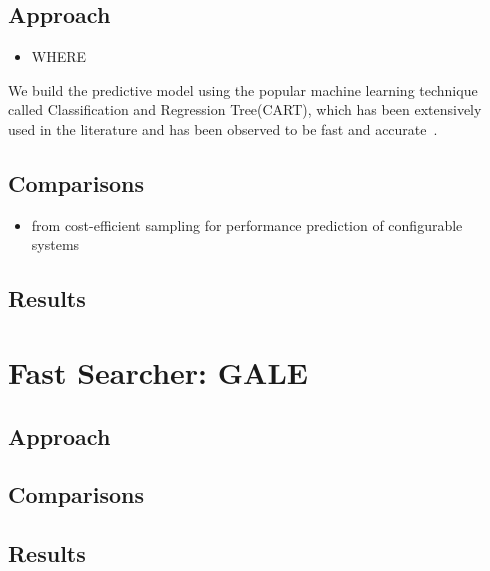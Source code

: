 \documentclass{sig-alternative}
\newcommand{\bi}{\begin{itemize}[leftmargin=0.4cm]}
\newcommand{\ei}{\end{itemize}}
\begin{document}
\subsection{Approach}
\bi
    \item{WHERE}
\ei

We build the predictive model using the popular machine learning technique called Classification and Regression Tree(CART), which has been extensively used in the literature and has been observed to be fast and accurate~\cite{guo2013variability}.
\subsection{Comparisons}
\bi
    \item{from cost-efficient sampling for performance prediction of configurable systems}
\ei
\subsection{Results}
\section{Fast Searcher: GALE}
\subsection{Approach}
\subsection{Comparisons}
\subsection{Results}




 

 
  
\end{document}
